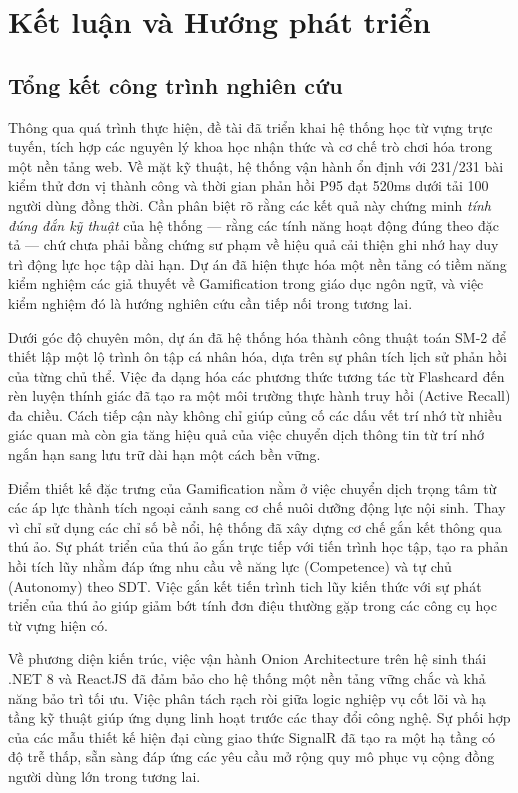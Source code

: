 \chapter{Kết luận và Hướng phát triển}
\label{Chapter4}

\section{Tổng kết công trình nghiên cứu}

Thông qua quá trình thực hiện, đề tài đã triển khai hệ thống học từ vựng trực tuyến, tích hợp các nguyên lý khoa học nhận thức và cơ chế trò chơi hóa trong một nền tảng web. Về mặt kỹ thuật, hệ thống vận hành ổn định với 231/231 bài kiểm thử đơn vị thành công và thời gian phản hồi P95 đạt 520ms dưới tải 100 người dùng đồng thời. Cần phân biệt rõ rằng các kết quả này chứng minh \textit{tính đúng đắn kỹ thuật} của hệ thống — rằng các tính năng hoạt động đúng theo đặc tả — chứ chưa phải bằng chứng sư phạm về hiệu quả cải thiện ghi nhớ hay duy trì động lực học tập dài hạn. Dự án đã hiện thực hóa một nền tảng có tiềm năng kiểm nghiệm các giả thuyết về Gamification trong giáo dục ngôn ngữ, và việc kiểm nghiệm đó là hướng nghiên cứu cần tiếp nối trong tương lai.

Dưới góc độ chuyên môn, dự án đã hệ thống hóa thành công thuật toán SM-2 để thiết lập một lộ trình ôn tập cá nhân hóa, dựa trên sự phân tích lịch sử phản hồi của từng chủ thể. Việc đa dạng hóa các phương thức tương tác từ Flashcard đến rèn luyện thính giác đã tạo ra một môi trường thực hành truy hồi (Active Recall) đa chiều. Cách tiếp cận này không chỉ giúp củng cố các dấu vết trí nhớ từ nhiều giác quan mà còn gia tăng hiệu quả của việc chuyển dịch thông tin từ trí nhớ ngắn hạn sang lưu trữ dài hạn một cách bền vững.

Điểm thiết kế đặc trưng của Gamification nằm ở việc chuyển dịch trọng tâm từ các áp lực thành tích ngoại cảnh sang cơ chế nuôi dưỡng động lực nội sinh. Thay vì chỉ sử dụng các chỉ số bề nổi, hệ thống đã xây dựng cơ chế gắn kết thông qua thú ảo. Sự phát triển của thú ảo gắn trực tiếp với tiến trình học tập, tạo ra phản hồi tích lũy nhằm đáp ứng nhu cầu về năng lực (Competence) và tự chủ (Autonomy) theo SDT. Việc gắn kết tiến trình tich lũy kiến thức với sự phát triển của thú ảo giúp giảm bớt tính đơn điệu thường gặp trong các công cụ học từ vựng hiện có.

Về phương diện kiến trúc, việc vận hành Onion Architecture trên hệ sinh thái .NET 8 và ReactJS đã đảm bảo cho hệ thống một nền tảng vững chắc và khả năng bảo trì tối ưu. Việc phân tách rạch ròi giữa logic nghiệp vụ cốt lõi và hạ tầng kỹ thuật giúp ứng dụng linh hoạt trước các thay đổi công nghệ. Sự phối hợp của các mẫu thiết kế hiện đại cùng giao thức SignalR đã tạo ra một hạ tầng có độ trễ thấp, sẵn sàng đáp ứng các yêu cầu mở rộng quy mô phục vụ cộng đồng người dùng lớn trong tương lai.

